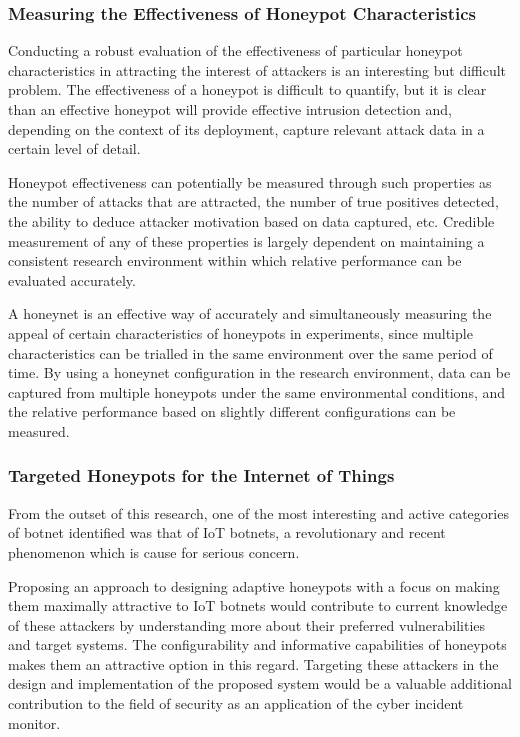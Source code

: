 \subsubsection{Measuring the Effectiveness of Honeypot Characteristics} \label{BenefitsForUsingHoneynetForExperiments}
Conducting a robust evaluation of the effectiveness of particular honeypot characteristics in attracting the interest of attackers is an interesting but difficult problem. The effectiveness of a honeypot is difficult to quantify, but it is clear than an effective honeypot will provide effective intrusion detection and, depending on the context of its deployment, capture relevant attack data in a certain level of detail.

Honeypot effectiveness can potentially be measured through such properties as the number of attacks that are attracted, the number of true positives detected, the ability to deduce attacker motivation based on data captured, etc. \cite{Nawrocki2016} Credible measurement of any of these properties is largely dependent on maintaining a consistent research environment within which relative performance can be evaluated accurately.

A honeynet is an effective way of accurately and simultaneously measuring the appeal of certain characteristics of honeypots in experiments, since multiple characteristics can be trialled in the same environment over the same period of time. By using a honeynet configuration in the research environment, data can be captured from multiple honeypots under the same environmental conditions, and the relative performance based on slightly different configurations can be measured. 


\subsubsection{Targeted Honeypots for the Internet of Things}
From the outset of this research, one of the most interesting and active categories of botnet identified was that of IoT botnets, a revolutionary and recent phenomenon which is cause for serious concern. 

Proposing an approach to designing adaptive honeypots with a focus on making them maximally attractive to IoT botnets would contribute to current knowledge of these attackers by understanding more about their preferred vulnerabilities and target systems. The configurability and informative capabilities of honeypots makes them an attractive option in this regard. Targeting these attackers in the design and implementation of the proposed system would be a valuable additional contribution to the field of security as an application of the cyber incident monitor.





